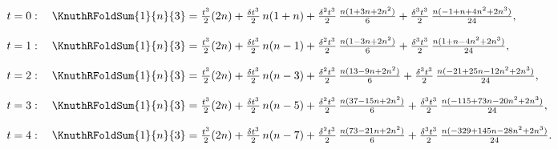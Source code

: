 \begin{example}
  \begin{align*}
    t=0:\quad
    \KnuthRFoldSum{1}{n}{3}
    &=
    \tfrac{t^3}{2}(2n)
    +
    \tfrac{\delta t^3}{2}\, n(1+n)
    +
    \tfrac{\delta^2 t^3}{2}\,\tfrac{n(1+3n+2n^2)}{6}
    +
    \tfrac{\delta^3 t^3}{2}\,\tfrac{n(-1+n+4n^2+2n^3)}{24},
    \\[8pt]
    t=1:\quad
    \KnuthRFoldSum{1}{n}{3}
    &=
    \tfrac{t^3}{2}(2n)
    +
    \tfrac{\delta t^3}{2}\, n(n-1)
    +
    \tfrac{\delta^2 t^3}{2}\,\tfrac{n(1-3n+2n^2)}{6}
    +
    \tfrac{\delta^3 t^3}{2}\,\tfrac{n(1+n-4n^2+2n^3)}{24},
    \\[8pt]
    t=2:\quad
    \KnuthRFoldSum{1}{n}{3}
    &=
    \tfrac{t^3}{2}(2n)
    +
    \tfrac{\delta t^3}{2}\, n(n-3)
    +
    \tfrac{\delta^2 t^3}{2}\,\tfrac{n(13-9n+2n^2)}{6}
    +
    \tfrac{\delta^3 t^3}{2}\,\tfrac{n(-21+25n-12n^2+2n^3)}{24},
    \\[8pt]
    t=3:\quad
    \KnuthRFoldSum{1}{n}{3}
    &=
    \tfrac{t^3}{2}(2n)
    +
    \tfrac{\delta t^3}{2}\, n(n-5)
    +
    \tfrac{\delta^2 t^3}{2}\,\tfrac{n(37-15n+2n^2)}{6}
    +
    \tfrac{\delta^3 t^3}{2}\,\tfrac{n(-115+73n-20n^2+2n^3)}{24},
    \\[8pt]
    t=4:\quad
    \KnuthRFoldSum{1}{n}{3}
    &=
    \tfrac{t^3}{2}(2n)
    +
    \tfrac{\delta t^3}{2}\, n(n-7)
    +
    \tfrac{\delta^2 t^3}{2}\,\tfrac{n(73-21n+2n^2)}{6}
    +
    \tfrac{\delta^3 t^3}{2}\,\tfrac{n(-329+145n-28n^2+2n^3)}{24}.
  \end{align*}
\end{example}
